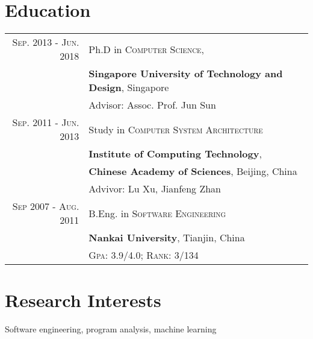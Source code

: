 \documentclass[a4paper,10pt]{article}
\begin{document}
\section{Education}
\begin{tabular}{rl}	
 \textsc{Sep.} 2013 - \textsc{Jun.} 2018  & Ph.D in \textsc{Computer Science}, \\
& \textbf{Singapore University of Technology and Design}, Singapore\\
& \small Advisor: Assoc. Prof. Jun Sun\\

\textsc{Sep.} 2011 - \textsc{Jun.} 2013& Study in \textsc{Computer System Architecture} \\
& \textbf{Institute of Computing Technology},\\
& \textbf{Chinese Academy of Sciences}, Beijing, China\\
& \small Advivor: Lu Xu, Jianfeng Zhan\\


\textsc{Sep} 2007 - \textsc{Aug.} 2011& B.Eng. in \textsc{Software Engineering} \\
& \textbf{Nankai University}, Tianjin, China\\
&\normalsize \textsc{Gpa}: 3.9/4.0; \textsc{Rank}: 3/134 
\end{tabular}

\section{Research Interests}
Software engineering, program analysis, machine learning
\end{document}
